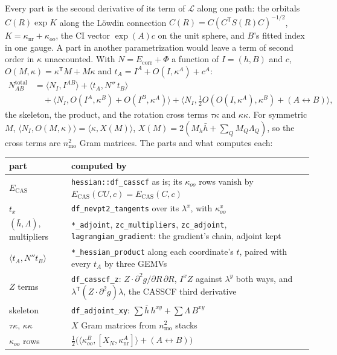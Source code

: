 \documentclass[11pt]{article}
\newcommand{\code}[1]{\texttt{#1}}
\newcommand{\Lag}{\mathcal L}
\newcommand{\Ecas}{E_{\mathrm{CAS}}}
\newcommand{\Ecorr}{E_{\mathrm{corr}}}
\newcommand{\hb}{\bar h}
\newcommand{\Lb}{\Lambda}
\newcommand{\T}{\mathsf T}
\begin{document}
Every part is the second derivative of its term of $\Lag$ along one path:
the orbitals $C(R)\exp K$ along the L\"owdin connection
$C(R) = C(C^\T S(R)C)^{-1/2}$, $K = \kappa_{\mathrm{nr}} + \kappa_{oo}$, the CI
vector $\exp(A)c$ on the unit sphere, and $B$'s fitted index in one gauge.
A part in another parametrization would leave a term of second order in
$\kappa$ unaccounted. With $N = \Ecorr + \Phi$ a function of
$I = (h, B)$ and $c$, $O(M, \kappa) = \kappa^\T M + M\kappa$ and
$t_A = I^A + O(I, \kappa^A) + c^A$:
\begin{equation}
\begin{aligned}
  N^{\mathrm{total}}_{AB} &= \langle N_I, I^{AB}\rangle
  + \langle t_A, N''\,t_B\rangle\\
  &\quad + \langle N_I, O(I^A, \kappa^B) + O(I^B, \kappa^A)\rangle
  + \langle N_I, \tfrac12 O(O(I, \kappa^A), \kappa^B) + (A\leftrightarrow B)\rangle,
\end{aligned}
  \label{eq:Nab}
\end{equation}
the skeleton, the product, and the rotation cross terms $\tau\kappa$ and
$\kappa\kappa$. For symmetric $M$, $\langle N_I, O(M, \kappa)\rangle =
\langle\kappa, X(M)\rangle$, $X(M) = 2(M_h\hb + \sum_Q M_Q\Lb_Q)$, so the
cross terms are $n_{\mathrm{mo}}^2$ Gram matrices. The parts and what
computes each:

\begin{center}
\small
\begin{tabularx}{\linewidth}{@{}lX@{}}
\toprule
part & computed by \\
\midrule
$\Ecas$ & \code{hessian::df\_casscf} as is; its $\kappa_{oo}$ rows vanish by $\Ecas(CU, c) = \Ecas(C, c)$ \\
$t_x$ & \code{df\_nevpt2\_tangents} over its $\lambda^x$, with $\kappa^x_{oo}$ \\
$(\hb, \Lb)$, multipliers & \code{*\_adjoint}, \code{zc\_multipliers}, \code{zc\_adjoint}, \code{lagrangian\_gradient}: the gradient's chain, adjoint kept \\
$\langle t_A, N'' t_B\rangle$ & \code{*\_hessian\_product} along each coordinate's $t$, paired with every $t_A$ by three GEMVs \\
$Z$ terms & \code{df\_casscf\_z}: $Z\cdot\partial^2g/\partial R\,\partial R$, $I^xZ$ against $\lambda^y$ both ways, and $\lambda^\T(Z\cdot\partial^2 g)\lambda$, the CASSCF third derivative \\
skeleton & \code{df\_adjoint\_xy}: $\sum\hb\,h^{xy} + \sum\Lb\,B^{xy}$ \\
$\tau\kappa$, $\kappa\kappa$ & $X$ Gram matrices from $n_{\mathrm{mo}}^2$ stacks \\
$\kappa_{oo}$ rows & $\tfrac12\bigl(\langle\kappa^B_{oo}, [X_N, \kappa^A_{\mathrm{nr}}]\rangle + (A\leftrightarrow B)\bigr)$ \\
\bottomrule
\end{tabularx}
\end{center}
\end{document}

